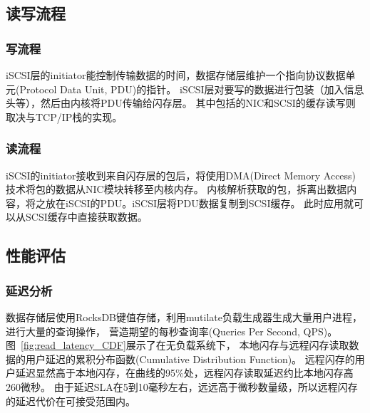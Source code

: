 \subsection{读写流程}
\subsubsection{写流程}
iSCSI层的initiator能控制传输数据的时间，数据存储层维护一个指向协议数据单元(Protocol Data Unit, PDU)的指针。
iSCSI层对要写的数据进行包装（加入信息头等），然后由内核将PDU传输给闪存层。
其中包括的NIC和SCSI的缓存读写则取决与TCP/IP栈的实现。
\subsubsection{读流程}
iSCSI的initiator接收到来自闪存层的包后，将使用DMA(Direct Memory Access)技术将包的数据从NIC模块转移至内核内存。
内核解析获取的包，拆离出数据内容，将之放在iSCSI的PDU。iSCSI层将PDU数据复制到SCSI缓存。
此时应用就可以从SCSI缓存中直接获取数据。

\subsection{性能评估}
\subsubsection{延迟分析}
数据存储层使用RocksDB键值存储，利用mutilate负载生成器\cite{leverich2014mutilate}生成大量用户进程，进行大量的查询操作，
营造期望的每秒查询率(Queries Per Second, QPS)。图~\ref{fig:read_latency_CDF}展示了在无负载系统下，
本地闪存与远程闪存读取数据的用户延迟的累积分布函数(Cumulative Distribution Function)。
远程闪存的用户延迟显然高于本地闪存，在曲线的95\%处，远程闪存读取延迟约比本地闪存高260微秒。
由于延迟SLA在5到10毫秒左右，远远高于微秒数量级，所以远程闪存的延迟代价在可接受范围内。

